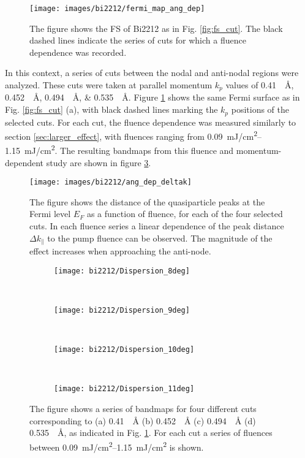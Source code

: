 \begin{figure}[t]
	\centering
	\texttt{[image: images/bi2212/fermi\_map\_ang\_dep]}
	\caption{The figure shows the FS of Bi2212 as in Fig. \ref{fig:fs_cut}. The black dashed lines indicate the series of cuts for which a fluence dependence was recorded.}
	\label{fig:fermimap_angdep}
\end{figure}

In this context, a series of cuts between the nodal and anti-nodal regions were analyzed.
These cuts were taken at parallel momentum $k_p$ values of \qtylist{0.41;0.452;0.494;0.535}{\per\angstrom}.
Figure  \ref{fig:fermimap_angdep} shows the same Fermi surface as in Fig. \ref{fig:fs_cut} (a), with black dashed lines marking the $k_p$ positions of the selected cuts.
For each cut, the fluence dependence was measured similarly to section \ref{sec:larger_effect}, with fluences ranging from \qtyrange{0.09}{1.15}{\milli\joule/\centi\meter\squared}.
The resulting bandmaps from this fluence and momentum-dependent study are shown in figure \ref{fig:effect_angle}.

\begin{figure}[b!]
	\centering
	\texttt{[image: images/bi2212/ang\_dep\_deltak]}
	\caption{The figure shows the distance of the quasiparticle peaks at the Fermi level $E_F$ as a function of fluence, for each of the four selected cuts. In each fluence series a linear dependence of the peak distance $\Delta k_\parallel$ to the pump fluence can be observed. The magnitude of the effect increases when approaching the anti-node.}
	\label{fig:angdep_deltak}
\end{figure}

\begin{figure}[t!]
	\centering
	\begin{subfigure}[b]{0.95\textwidth}
		\texttt{[image: bi2212/Dispersion\_8deg]}
		\caption{}
	\end{subfigure}
	\\
	\begin{subfigure}[b]{0.95\textwidth}
		\texttt{[image: bi2212/Dispersion\_9deg]}
		\caption{}
	\end{subfigure}
	\\
	\begin{subfigure}[b]{0.95\textwidth}
		\texttt{[image: bi2212/Dispersion\_10deg]}
		\caption{}
	\end{subfigure}
	\\
	\begin{subfigure}[b]{0.95\textwidth}
		\texttt{[image: bi2212/Dispersion\_11deg]}
		\caption{}
	\end{subfigure}
	\caption{The figure shows a series of bandmaps for four different cuts corresponding to (a) \qty{0.41}{\per\angstrom} (b) \qty{0.452}{\per\angstrom} (c) \qty{0.494}{\per\angstrom} (d) \qty{0.535}{\per\angstrom}, as indicated in Fig. \ref{fig:fermimap_angdep}. For each cut a series of fluences between \qtyrange{0.09}{1.15}{\milli\joule/\centi\meter\squared} is shown.}
	\label{fig:effect_angle}
\end{figure}

